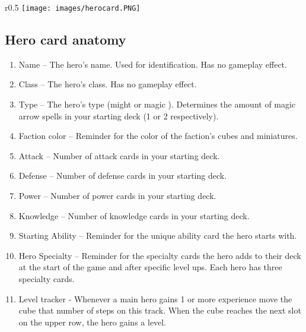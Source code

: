 \documentclass[12pt]{article}
\begin{document}
\clearpage

\begin{wrapfigure}{r}{0.5\textwidth}
\texttt{[image: images/herocard.PNG]} 
\end{wrapfigure}
\subsection*{\hypertarget{Herocard}{Hero card anatomy}}
\begin{enumerate}
\item Name – The hero’s name. Used for identification. Has no gameplay effect.
\item Class – The hero’s class. Has no gameplay effect.
\item Type – The hero’s type (might  or magic ). Determines the amount of magic arrow spells in your starting deck (1 or 2 respectively).
\item Faction color – Reminder for the color of the faction’s cubes and miniatures.
\item Attack – Number of attack cards in your starting deck.
\item Defense – Number of defense cards in your starting deck.
\item Power – Number of power cards in your starting deck.
\item Knowledge – Number of knowledge cards in your starting deck.
\item Starting Ability – Reminder for the unique ability card the hero starts with.
\item Hero Specialty – Reminder for the specialty cards the hero adds to their deck at the start of the game and after specific level ups. Each hero has three specialty cards.
\item Level tracker - Whenever a main hero gains 1 or more experience  move the cube that number of steps on this track. When the cube reaches the next slot on the upper row, the hero gains a level.
\end{enumerate}
\clearpage
\end{document}
